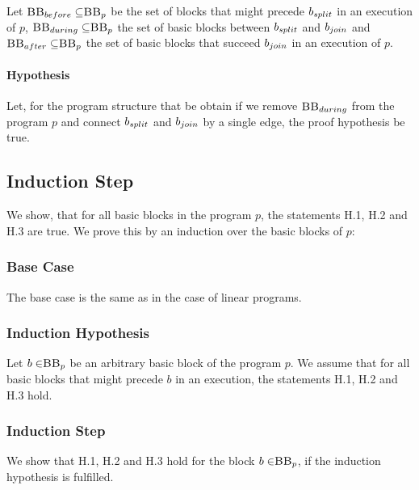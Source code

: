 Let $\mbb_{before} \subseteq \mbb_p$ be the set of blocks that might precede $b_{split}$ in an execution of $p$, $\mbb_{during} \subseteq \mbb_p$ the set of basic blocks between $b_{split}$ and $b_{join}$ and $\mbb_{after} \subseteq \mbb_p$ the set of basic blocks that succeed $b_{join}$ in an execution of $p$.

\paragraph{Hypothesis}
Let, for the program structure that be obtain if we remove $\mbb_{during}$ from the program $p$ and connect $b_{split}$ and $b_{join}$ by a single edge, the proof hypothesis be true.

\subsection*{Induction Step}
We show, that for all basic blocks in the program $p$, the statements H.1, H.2 and H.3 are true. We prove this by an induction over the basic blocks of $p$:

\subsubsection{Base Case}
The base case is the same as in the case of linear programs.

\subsubsection{Induction Hypothesis}
Let $b \in \mbb_p$ be an arbitrary basic block of the program $p$. We assume that for all basic blocks that might precede $b$ in an execution, the statements H.1, H.2 and H.3 hold.

\subsubsection{Induction Step}
We show that H.1, H.2 and H.3 hold for the block $b \in \mbb_p$, if the induction hypothesis is fulfilled.

